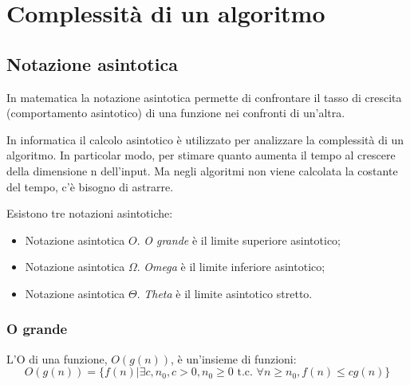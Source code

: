 \part{Complessità di un algoritmo}

\chapter{Notazione asintotica}

In matematica la notazione asintotica permette di confrontare il tasso di crescita (comportamento asintotico) di una funzione nei confronti di un’altra.


In informatica il calcolo asintotico è utilizzato per analizzare la complessità di un algoritmo. In particolar modo, per stimare quanto aumenta il tempo al crescere della dimensione n dell'input. Ma negli algoritmi non viene calcolata la costante del tempo, c'è bisogno di astrarre.

Esistono tre notazioni asintotiche:
\begin{itemize}
    \item Notazione asintotica $O$. \textit{O grande} è il limite superiore asintotico;
    \item Notazione asintotica $\Omega$. \textit{Omega} è il limite inferiore asintotico;
    \item Notazione asintotica $\Theta$. \textit{Theta} è il limite asintotico stretto.
\end{itemize}


\section{O grande}
L'O di una funzione, $O(g(n))$, è un'insieme di funzioni:
\begin{equation*}
    O(g(n))=\{f(n)|\exists c,n_0, c>0, n_0\geq0 \text{ t.c. } \forall n\geq n_0, f(n)\leq cg(n)\}
\end{equation*}


